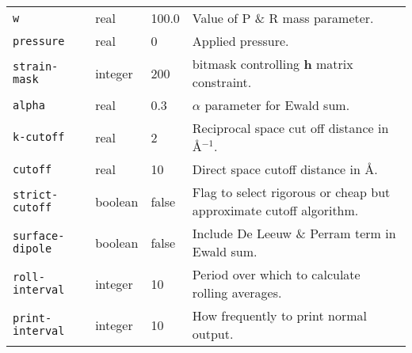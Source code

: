 \begin{table}
\begin{minipage}{\textwidth}
\begin{tabular}{|l|l|l|p{2.7in}|}
\verb'w' &		    	real &			100.0 &
Value of P \& R mass parameter. \\
\verb'pressure' &	    	real &			0 &
Applied pressure. \\
\verb'strain-mask' &		integer &		200 &
bitmask controlling $\bm{h}$ matrix constraint. \\ \hline
\verb'alpha' &	    		real &			0.3 &
$\alpha$ parameter for Ewald sum. \\
\verb'k-cutoff' &		real &			2 &
Reciprocal space cut off distance in \AA$^{-1}$. \\
\verb'cutoff' &	    	real &			10 &
Direct space cutoff distance in \AA. \\
\verb'strict-cutoff' &	    	boolean &		false &
Flag to select rigorous or cheap but approximate cutoff algorithm. \\
\verb'surface-dipole' &	boolean & 		false  &
Include De Leeuw \& Perram term in Ewald sum. \\ \hline
\verb'roll-interval' &   	integer & 		10 &
Period over which to calculate rolling averages. \\
\verb'print-interval' &  	integer & 		10 &
How frequently to print normal output. \\ \hline
\end{tabular}
\end{minipage}
\end{table}
